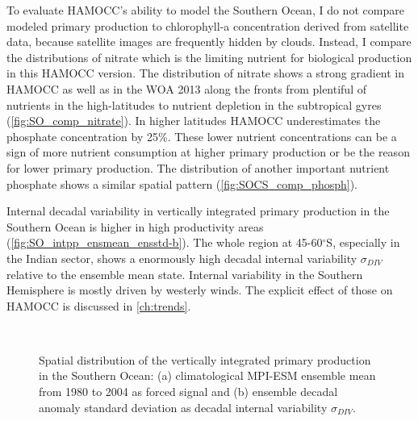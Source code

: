 To evaluate \acs{HAMOCC}'s ability to model the Southern Ocean, I do not compare modeled primary production to chlorophyll-a  concentration derived from satellite data, because satellite images are frequently  hidden by clouds. Instead, I compare the distributions of nitrate which is the limiting nutrient for biological production in this \acs{HAMOCC} version. %
The distribution of nitrate shows a strong gradient in \acs{HAMOCC} as well as in the \ac{WOA} 2013  \citep{WOA2013} along the fronts from plentiful of nutrients in the high-latitudes to nutrient depletion in the subtropical gyres (\autoref{fig:SO_comp_nitrate}). In higher latitudes \acs{HAMOCC} underestimates the phosphate concentration by 25\%. These lower nutrient concentrations can be a sign of more nutrient consumption at higher primary production or be the reason for lower primary production. The distribution of another important nutrient phosphate shows a similar spatial pattern (\autoref{fig:SOCS_comp_phosph}).\newline

Internal decadal variability in vertically integrated primary production in the Southern Ocean is higher in high productivity areas (\autoref{fig:SO_intpp_ensmean_ensstd-b}). The whole region at 45-60$^\circ$S, especially in the Indian sector, shows a enormously high decadal internal variability $\sigma_{DIV}$ relative to the ensemble mean state. Internal variability in the Southern Hemisphere is mostly driven by westerly winds. The explicit effect of those on \acs{HAMOCC} is discussed in \autoref{ch:trends}.\newline


\begin{figure}[bth]
        \myfloatalign
         \\
        \caption{Spatial distribution of the vertically integrated primary production in the Southern Ocean: (a) climatological \acs{MPI-ESM} ensemble mean from 1980 to 2004 as forced signal and (b) ensemble decadal anomaly standard deviation as decadal internal variability $\sigma_{DIV}$.} \label{fig:SO_intpp_ensmean_ensstd}
\end{figure}


